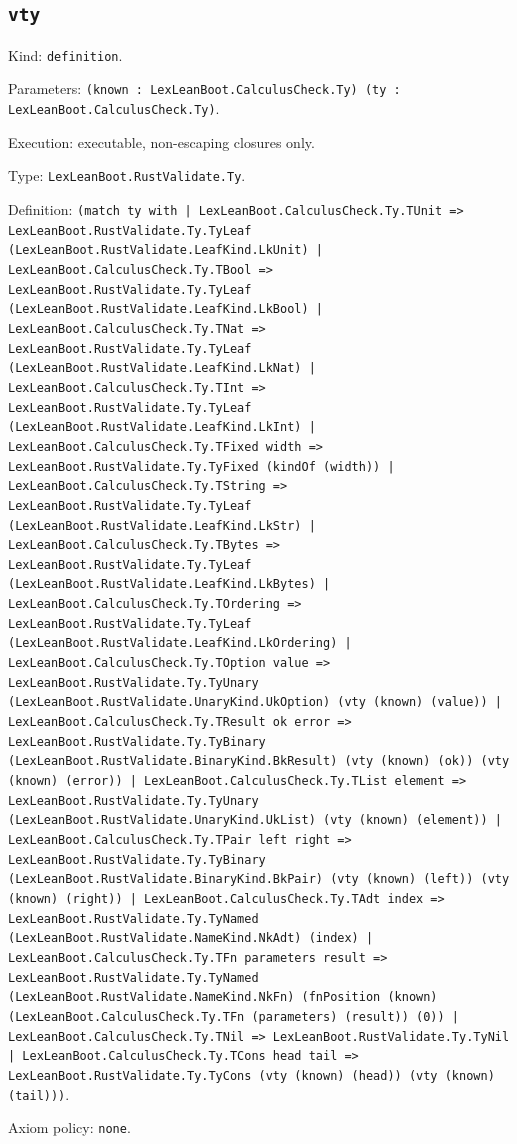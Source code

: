 \documentclass[11pt]{article}
\begin{document}
\subsection*{\texttt{vty}}
\noindent Kind: \texttt{definition}.\par
\noindent Parameters: \texttt{(known : LexLeanBoot.CalculusCheck.Ty) (ty : LexLeanBoot.CalculusCheck.Ty)}.\par
\noindent Execution: executable, non-escaping closures only.\par
\noindent Type: \texttt{LexLeanBoot.RustValidate.Ty}.\par
\noindent Definition: \texttt{(match ty with | LexLeanBoot.CalculusCheck.Ty.TUnit => LexLeanBoot.RustValidate.Ty.TyLeaf (LexLeanBoot.RustValidate.LeafKind.LkUnit) | LexLeanBoot.CalculusCheck.Ty.TBool => LexLeanBoot.RustValidate.Ty.TyLeaf (LexLeanBoot.RustValidate.LeafKind.LkBool) | LexLeanBoot.CalculusCheck.Ty.TNat => LexLeanBoot.RustValidate.Ty.TyLeaf (LexLeanBoot.RustValidate.LeafKind.LkNat) | LexLeanBoot.CalculusCheck.Ty.TInt => LexLeanBoot.RustValidate.Ty.TyLeaf (LexLeanBoot.RustValidate.LeafKind.LkInt) | LexLeanBoot.CalculusCheck.Ty.TFixed width => LexLeanBoot.RustValidate.Ty.TyFixed (kindOf (width)) | LexLeanBoot.CalculusCheck.Ty.TString => LexLeanBoot.RustValidate.Ty.TyLeaf (LexLeanBoot.RustValidate.LeafKind.LkStr) | LexLeanBoot.CalculusCheck.Ty.TBytes => LexLeanBoot.RustValidate.Ty.TyLeaf (LexLeanBoot.RustValidate.LeafKind.LkBytes) | LexLeanBoot.CalculusCheck.Ty.TOrdering => LexLeanBoot.RustValidate.Ty.TyLeaf (LexLeanBoot.RustValidate.LeafKind.LkOrdering) | LexLeanBoot.CalculusCheck.Ty.TOption value => LexLeanBoot.RustValidate.Ty.TyUnary (LexLeanBoot.RustValidate.UnaryKind.UkOption) (vty (known) (value)) | LexLeanBoot.CalculusCheck.Ty.TResult ok error => LexLeanBoot.RustValidate.Ty.TyBinary (LexLeanBoot.RustValidate.BinaryKind.BkResult) (vty (known) (ok)) (vty (known) (error)) | LexLeanBoot.CalculusCheck.Ty.TList element => LexLeanBoot.RustValidate.Ty.TyUnary (LexLeanBoot.RustValidate.UnaryKind.UkList) (vty (known) (element)) | LexLeanBoot.CalculusCheck.Ty.TPair left right => LexLeanBoot.RustValidate.Ty.TyBinary (LexLeanBoot.RustValidate.BinaryKind.BkPair) (vty (known) (left)) (vty (known) (right)) | LexLeanBoot.CalculusCheck.Ty.TAdt index => LexLeanBoot.RustValidate.Ty.TyNamed (LexLeanBoot.RustValidate.NameKind.NkAdt) (index) | LexLeanBoot.CalculusCheck.Ty.TFn parameters result => LexLeanBoot.RustValidate.Ty.TyNamed (LexLeanBoot.RustValidate.NameKind.NkFn) (fnPosition (known) (LexLeanBoot.CalculusCheck.Ty.TFn (parameters) (result)) (0)) | LexLeanBoot.CalculusCheck.Ty.TNil => LexLeanBoot.RustValidate.Ty.TyNil | LexLeanBoot.CalculusCheck.Ty.TCons head tail => LexLeanBoot.RustValidate.Ty.TyCons (vty (known) (head)) (vty (known) (tail)))}.\par
\noindent Axiom policy: \texttt{none}.\par
\end{document}
